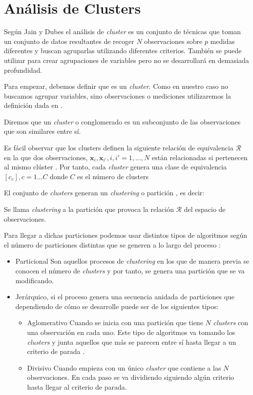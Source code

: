\section{Análisis de Clusters}

\noindent Según Jain y Dubes  el análisis de \emph{cluster} es un conjunto de técnicas que toman un conjunto de datos resultantes de recoger $N$ observaciones sobre $p$ medidas diferentes y buscan agruparlas utilizando diferentes criterios. También se puede utilizar para crear agrupaciones de variables pero no se desarrollará en demasiada profundidad. 

\noindent Para empezar, debemos definir que es un \emph{cluster}. Como en nuestro caso no buscamos agrupar variables, sino observaciones o mediciones utilizaremos la definición dada en \cite{Everitt 2011}.
\begin{defi}
Diremos que un \emph{cluster} o conglomerado es un subconjunto de las observaciones que son similares entre sí. 
\end{defi}

\noindent Es fácil observar que los clusters definen la siguiente relación de equivalencia $\mathcal{R}$ en la que dos observaciones, $\mathbf{x}_i,\mathbf{x}_{i'}, i,i'=1, \ldots, N$ están relacionadas si pertenecen al mismo clúster \cite{Cuadras 2014}. Por tanto, cada \emph{cluster} genera una clase de equivalencia $[c_c], c=1\ldots C$ donde $C$ es el número de clusters

\noindent El conjunto de \emph{clusters} generan un \emph{clustering} o partición , es decir:
\begin{defi}
Se llama \textit{clustering} a la partición que provoca la relación $\mathcal{R}$ del espacio de observaciones. 
\end{defi}

\noindent Para llegar a dichas particiones podemos usar distintos tipos de algoritmos según el número de particiones distintas que se generen a lo largo del proceso \cite{Jain 1988}:
\begin{itemize}
\item Particional Son aquellos procesos de \emph{clustering} en los que de manera previa se conocen el número de \emph{clusters} y por tanto, se genera una partición que se va modificando.
\item Jerárquico, si el proceso genera una secuencia anidada de particiones que dependiendo de cómo se desarrolle puede ser de los siguientes tipos:
\begin{itemize}
\item Aglomerativo Cuando se inicia con una partición que tiene $N$ \emph{clusters} con una observación en cada uno. Este tipo de algoritmos va tomando los \emph{clusters} y junta aquellos que más se parecen entre sí hasta llegar a un criterio de parada . 
\item Divisivo Cuando empieza con un único \emph{cluster} que contiene a las $N$ observaciones. En cada paso se va dividiendo siguiendo algún criterio hasta llegar al criterio de parada. 
\end{itemize}
\end{itemize}

